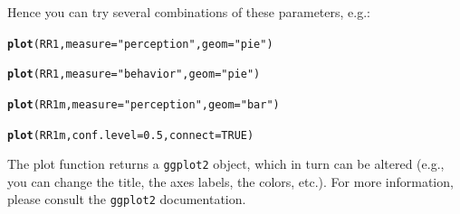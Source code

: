 \documentclass[a4paper]{article}\usepackage[]{graphicx}\usepackage[]{color}
\makeatletter
\newcommand{\hlnum}[1]{\textcolor[rgb]{0.686,0.059,0.569}{#1}}%
\newcommand{\hlstr}[1]{\textcolor[rgb]{0.192,0.494,0.8}{#1}}%
\newcommand{\hlstd}[1]{\textcolor[rgb]{0.345,0.345,0.345}{#1}}%
\newcommand{\hlkwc}[1]{\textcolor[rgb]{0.333,0.667,0.333}{#1}}%
\newcommand{\hlkwd}[1]{\textcolor[rgb]{0.737,0.353,0.396}{\textbf{#1}}}%
\newenvironment{kframe}{%
 \def\at@end@of@kframe{}%
 \ifinner\ifhmode%
  \def\at@end@of@kframe{\end{minipage}}%
  \begin{minipage}{\columnwidth}%
 \fi\fi%
 \def\FrameCommand##1{\hskip\@totalleftmargin \hskip-\fboxsep
 \colorbox{shadecolor}{##1}\hskip-\fboxsep
     \hskip-\linewidth \hskip-\@totalleftmargin \hskip\columnwidth}%
 \MakeFramed {\advance\hsize-\width
   \@totalleftmargin\z@ \linewidth\hsize
   \@setminipage}}%
 {\par\unskip\endMakeFramed%
 \at@end@of@kframe}
\newenvironment{knitrout}{}{} %
\makeatother
\begin{document}
Hence you can try several combinations of these parameters, e.g.:

\begin{knitrout}\small
{}\color{fgcolor}\begin{kframe}
\begin{alltt}
\hlkwd{plot}\hlstd{(RR1,} \hlkwc{measure} \hlstd{=} \hlstr{"perception"}\hlstd{,} \hlkwc{geom} \hlstd{=} \hlstr{"pie"}\hlstd{)}
\end{alltt}
\end{kframe}
\end{knitrout}



\begin{knitrout}\small
{}\color{fgcolor}\begin{kframe}
\begin{alltt}
\hlkwd{plot}\hlstd{(RR1,} \hlkwc{measure} \hlstd{=} \hlstr{"behavior"}\hlstd{,} \hlkwc{geom} \hlstd{=} \hlstr{"pie"}\hlstd{)}
\end{alltt}
\end{kframe}
\end{knitrout}



\begin{knitrout}\small
{}\color{fgcolor}\begin{kframe}
\begin{alltt}
\hlkwd{plot}\hlstd{(RR1m,} \hlkwc{measure} \hlstd{=} \hlstr{"perception"}\hlstd{,} \hlkwc{geom} \hlstd{=} \hlstr{"bar"}\hlstd{)}
\end{alltt}
\end{kframe}
\end{knitrout}


\begin{knitrout}\small
{}\color{fgcolor}\begin{kframe}
\begin{alltt}
\hlkwd{plot}\hlstd{(RR1m,} \hlkwc{conf.level} \hlstd{=} \hlnum{0.5}\hlstd{,} \hlkwc{connect} \hlstd{=} \hlnum{TRUE}\hlstd{)}
\end{alltt}
\end{kframe}
\end{knitrout}




The plot function returns a \texttt{ggplot2} object, which in turn can be altered (e.g., you can change the title, the axes labels, the colors, etc.). For more information, please consult the \texttt{ggplot2} documentation.
\end{document}
